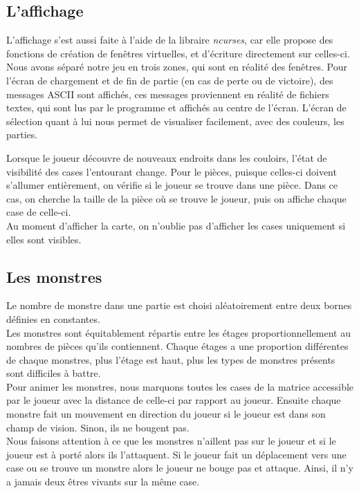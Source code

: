 \documentclass[11pt]{report}
\begin{document}
			
		\subsection{L'affichage}
		
		L'affichage s'est aussi faite à l'aide de la libraire \emph{ncurses}, car elle propose des fonctions de création de fenêtres virtuelles, et d'écriture directement sur celles-ci. Nous avons séparé notre jeu en trois zones, qui sont en réalité des fenêtres. Pour l'écran de chargement et de fin de partie (en cas de perte ou de victoire), des messages ASCII sont affichés, ces messages proviennent en réalité de fichiers textes, qui sont lus par le programme et affichés au centre de l'écran. L'écran de sélection quant à lui nous permet de visualiser facilement, avec des couleurs, les parties.
		
		\vspace{12pt}
		
		Lorsque le joueur découvre de nouveaux endroits dans les couloirs, l'état de visibilité des cases l'entourant change. Pour le pièces, puisque celles-ci doivent s'allumer entièrement, on vérifie si le joueur se trouve dans une pièce. Dans ce cas, on cherche la taille de la pièce où se trouve le joueur, puis on affiche chaque case de celle-ci.\\
		Au moment d'afficher la carte, on n'oublie pas d'afficher les cases uniquement si elles sont visibles.
		
		\subsection{Les monstres}
		
		Le nombre de monstre dans une partie est choisi aléatoirement entre deux bornes définies en constantes.\\
		Les monstres sont équitablement répartis entre les étages proportionnellement au nombres de pièces qu'ils contiennent. Chaque étages a une proportion différentes de chaque monstres, plus l'étage est haut, plus les types de monstres présents sont difficiles à battre.\\
		Pour animer les monstres, nous marquons toutes les cases de la matrice accessible par le joueur avec la distance de celle-ci par rapport au joueur. Ensuite chaque monstre fait un mouvement en direction du joueur si le joueur est dans son champ de vision. Sinon, ils ne bougent pas.\\
		Nous faisons attention à ce que les monstres n'aillent pas sur le joueur et si le joueur est à porté alors ils l'attaquent. Si le joueur fait un déplacement vers une case ou se trouve un monstre alors le joueur ne bouge pas et attaque. Ainsi, il n'y a jamais deux êtres vivants sur la même case.
		
\end{document}
